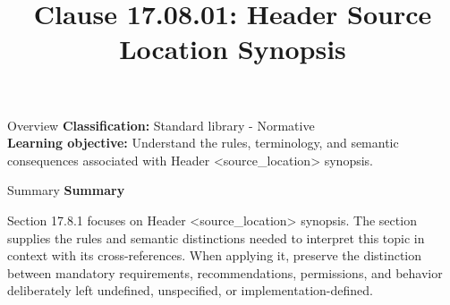 \documentclass[10pt,letterpaper]{article}
\title{Clause 17.08.01: Header Source Location Synopsis}
\author{}
\date{}
\begin{document}
\maketitle
\begin{CornellOverviewBox}{Overview}
\textbf{Classification:} Standard library - Normative\\[2pt]
\textbf{Learning objective:} Understand the rules, terminology, and semantic consequences associated with Header <source\_location> synopsis.
\end{CornellOverviewBox}\begin{CornellSummaryBox}{Summary}
{\sffamily\bfseries\color{Accent} Summary}\par\vspace{3pt}Section 17.8.1 focuses on Header <source\_location> synopsis. The section supplies the rules and semantic distinctions needed to interpret this topic in context with its cross-references. When applying it, preserve the distinction between mandatory requirements, recommendations, permissions, and behavior deliberately left undefined, unspecified, or implementation-defined.
\end{CornellSummaryBox}
\end{document}
